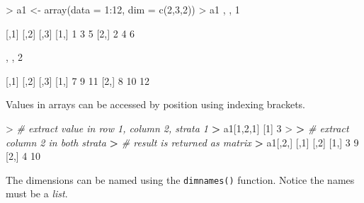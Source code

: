 \documentclass[
]{book}
\newenvironment{Shaded}{\begin{snugshade}}{\end{snugshade}}
\newcommand{\AttributeTok}[1]{\textcolor[rgb]{0.77,0.63,0.00}{#1}}
\newcommand{\CommentTok}[1]{\textcolor[rgb]{0.56,0.35,0.01}{\textit{#1}}}
\newcommand{\DecValTok}[1]{\textcolor[rgb]{0.00,0.00,0.81}{#1}}
\newcommand{\ErrorTok}[1]{\textcolor[rgb]{0.64,0.00,0.00}{\textbf{#1}}}
\newcommand{\FunctionTok}[1]{\textcolor[rgb]{0.00,0.00,0.00}{#1}}
\newcommand{\NormalTok}[1]{#1}
\newcommand{\OtherTok}[1]{\textcolor[rgb]{0.56,0.35,0.01}{#1}}
\newcommand{\SpecialCharTok}[1]{\textcolor[rgb]{0.00,0.00,0.00}{#1}}
\begin{document}
\begin{Shaded}
\begin{Highlighting}[]
\SpecialCharTok{\textgreater{}}\NormalTok{ a1 }\OtherTok{\textless{}{-}} \FunctionTok{array}\NormalTok{(}\AttributeTok{data =} \DecValTok{1}\SpecialCharTok{:}\DecValTok{12}\NormalTok{, }\AttributeTok{dim =} \FunctionTok{c}\NormalTok{(}\DecValTok{2}\NormalTok{,}\DecValTok{3}\NormalTok{,}\DecValTok{2}\NormalTok{))}
\SpecialCharTok{\textgreater{}}\NormalTok{ a1}
\NormalTok{, , }\DecValTok{1}

\NormalTok{     [,}\DecValTok{1}\NormalTok{] [,}\DecValTok{2}\NormalTok{] [,}\DecValTok{3}\NormalTok{]}
\NormalTok{[}\DecValTok{1}\NormalTok{,]    }\DecValTok{1}    \DecValTok{3}    \DecValTok{5}
\NormalTok{[}\DecValTok{2}\NormalTok{,]    }\DecValTok{2}    \DecValTok{4}    \DecValTok{6}

\NormalTok{, , }\DecValTok{2}

\NormalTok{     [,}\DecValTok{1}\NormalTok{] [,}\DecValTok{2}\NormalTok{] [,}\DecValTok{3}\NormalTok{]}
\NormalTok{[}\DecValTok{1}\NormalTok{,]    }\DecValTok{7}    \DecValTok{9}   \DecValTok{11}
\NormalTok{[}\DecValTok{2}\NormalTok{,]    }\DecValTok{8}   \DecValTok{10}   \DecValTok{12}
\end{Highlighting}
\end{Shaded}

Values in arrays can be accessed by position using indexing brackets.

\begin{Shaded}
\begin{Highlighting}[]
\SpecialCharTok{\textgreater{}} \CommentTok{\# extract value in row 1, column 2, strata 1}
\ErrorTok{\textgreater{}}\NormalTok{ a1[}\DecValTok{1}\NormalTok{,}\DecValTok{2}\NormalTok{,}\DecValTok{1}\NormalTok{]}
\NormalTok{[}\DecValTok{1}\NormalTok{] }\DecValTok{3}
\SpecialCharTok{\textgreater{}} 
\ErrorTok{\textgreater{}} \CommentTok{\# extract column 2 in both strata}
\ErrorTok{\textgreater{}} \CommentTok{\# result is returned as matrix}
\ErrorTok{\textgreater{}}\NormalTok{ a1[,}\DecValTok{2}\NormalTok{,]}
\NormalTok{     [,}\DecValTok{1}\NormalTok{] [,}\DecValTok{2}\NormalTok{]}
\NormalTok{[}\DecValTok{1}\NormalTok{,]    }\DecValTok{3}    \DecValTok{9}
\NormalTok{[}\DecValTok{2}\NormalTok{,]    }\DecValTok{4}   \DecValTok{10}
\end{Highlighting}
\end{Shaded}

The dimensions can be named using the \texttt{dimnames()} function. Notice the names must be a \emph{list}.
\end{document}

